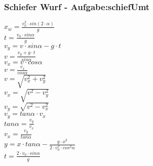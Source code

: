 \subsubsection{Schiefer Wurf  - Aufgabe:schiefUmt} 
\begin{minipage}{0.45\textwidth} 
$ x_{w}  = \frac{v_{0} ^{2} \cdot sin(2\cdot \alpha )}{       g} $\\ 
$ t =\frac{v_{0} \cdot sin \alpha }{  g} $\\ 
$ v_{y}  =  v\cdot sin\alpha - g\cdot t $\\ 
$ v= \frac{ v_{y} +g\cdot t}{ sin\alpha } $\\ 
$ v_{x}  = v\cdot  cos\alpha $\\ 
$ v= \frac{ v_{x} }{ cos\alpha } $\\ 
$ v= \sqrt{ v_{x} ^{2} + v_{y} ^{2} } $\\ 
$ v_{x} = \sqrt{ v^{2}  - v_{y} ^{2} } $\\ 
$ v_{y} = \sqrt{ v^{2}  - v_{x} ^{2} } $\\ 
$ v_{y} = tan \alpha \cdot  v_{x} $\\ 
$ tan \alpha = \frac{v_{y} }{v_{x} } $\\ 
$ v_{x} = \frac{v_{y} }{tan \alpha } $\\ 
$ y = x\cdot tan \alpha  - \frac{   g\cdot x^{2} }{2\cdot v^{2} _{0} \cdot cos ^{2}\alpha } $\\ 
$ t =\frac{2\cdot v_{0} \cdot sin \alpha }{ g} $\\ 
\end{minipage} 
\begin{minipage}{0.45\textwidth} 
 
\end{minipage} 
